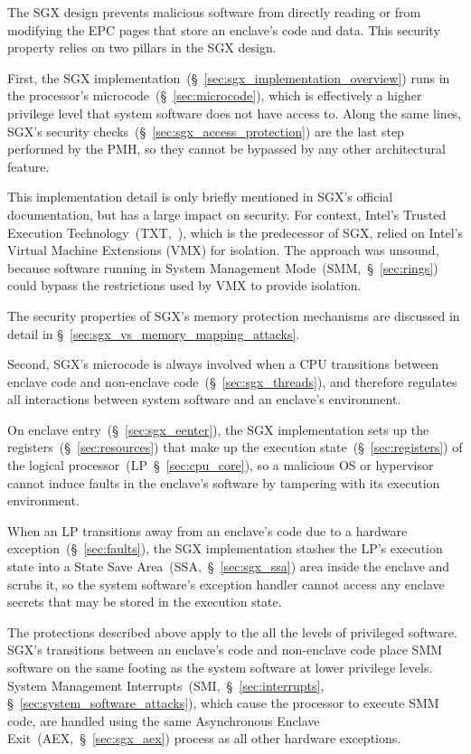 The SGX design prevents malicious software from directly reading or from
modifying the EPC pages that store an enclave's code and data. This security
property relies on two pillars in the SGX design.

First, the SGX implementation~(\S~\ref{sec:sgx_implementation_overview}) runs
in the processor's microcode~(\S~\ref{sec:microcode}), which is effectively a
higher privilege level that system software does not have access to.
Along the same lines, SGX's security
checks~(\S~\ref{sec:sgx_access_protection}) are the last step performed by the
PMH, so they cannot be bypassed by any other architectural feature.

This implementation detail is only briefly mentioned in SGX's official
documentation, but has a large impact on security. For context, Intel's Trusted
Execution Technology~(TXT,~\cite{grawrock2009txt}), which is the predecessor of
SGX, relied on Intel's Virtual Machine Extensions (VMX) for isolation. The
approach was unsound, because software running in System Management
Mode~(SMM,~\S~\ref{sec:rings}) could bypass the restrictions used by VMX to
provide isolation.

The security properties of SGX's memory protection mechanisms are discussed
in detail in \S~\ref{sec:sgx_vs_memory_mapping_attacks}.

Second, SGX's microcode is always involved when a CPU transitions between
enclave code and non-enclave code~(\S~\ref{sec:sgx_threads}), and therefore
regulates all interactions between system software and an enclave's
environment.

On enclave entry~(\S~\ref{sec:sgx_eenter}), the SGX implementation sets up the
registers~(\S~\ref{sec:resources}) that make up the execution
state~(\S~\ref{sec:registers}) of the logical
processor~(LP~\S~\ref{sec:cpu_core}), so a malicious OS or hypervisor cannot
induce faults in the enclave's software by tampering with its execution
environment.

When an LP transitions away from an enclave's code due to a
hardware exception~(\S~\ref{sec:faults}), the SGX implementation stashes the
LP's execution state into a State Save Area~(SSA,~\S~\ref{sec:sgx_ssa}) area
inside the enclave and scrubs it, so the system software's exception handler
cannot access any enclave secrets that may be stored in the execution state.

The protections described above apply to the all the levels of privileged
software. SGX's transitions between an enclave's code and non-enclave code
place SMM software on the same footing as the system software at lower
privilege levels. System Management Interrupts~(SMI,~\S~\ref{sec:interrupts},
\S~\ref{sec:system_software_attacks}), which cause the processor to execute
SMM code, are handled using the same Asynchronous Enclave
Exit~(AEX,~\S~\ref{sec:sgx_aex}) process as all other hardware exceptions.

